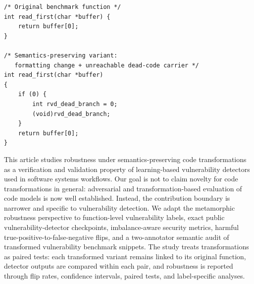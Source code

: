 \documentclass[a4paper,fleqn]{cas-dc}
\begin{document}
\begin{lstlisting}[style=code,caption={Motivating example of a harmless source-level transformation. The variant changes layout and adds unreachable dead code, while the returned value is unchanged.},label={lst:motivating-example}]
/* Original benchmark function */
int read_first(char *buffer) {
    return buffer[0];
}

/* Semantics-preserving variant:
   formatting change + unreachable dead-code carrier */
int read_first(char *buffer)
{
    if (0) {
        int rvd_dead_branch = 0;
        (void)rvd_dead_branch;
    }
    return buffer[0];
}
\end{lstlisting}

This article studies robustness under semantics-preserving code transformations
as a verification and validation property of learning-based vulnerability
detectors used in software systems workflows. Our
goal is not to claim novelty for code transformations in general: adversarial
and transformation-based evaluation of code models is now well established.
Instead, the contribution boundary is narrower and specific to vulnerability
detection. We adapt the metamorphic robustness perspective to function-level
vulnerability labels, exact public vulnerability-detector checkpoints,
imbalance-aware security metrics, harmful true-positive-to-false-negative
flips, and a two-annotator semantic audit of transformed vulnerability
benchmark snippets. The study treats transformations as paired tests: each
transformed variant remains linked to its original function, detector outputs
are compared within each pair, and robustness is reported through flip rates,
confidence intervals, paired tests, and label-specific analyses.
\end{document}
